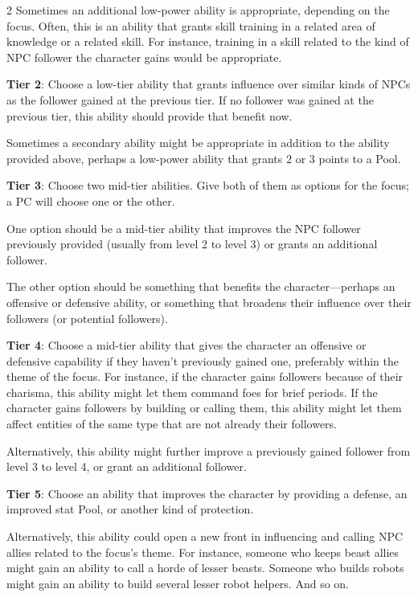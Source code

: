\begin{multicols}{2}
Sometimes an additional low-power ability is appropriate, depending on the focus. Often, this is an ability that grants skill training in a related area of knowledge or a related skill. For instance, training in a skill related to the kind of NPC follower the character gains would be appropriate.

\textbf{Tier 2}: Choose a low-tier ability that grants influence over similar kinds of NPCs as the follower gained at the previous tier. If no follower was gained at the previous tier, this ability should provide that benefit now. 

Sometimes a secondary ability might be appropriate in addition to the ability provided above, perhaps a low-power ability that grants 2 or 3 points to a Pool.

\textbf{Tier 3}: Choose two mid-tier abilities. Give both of them as options for the focus; a PC will choose one or the other.

One option should be a mid-tier ability that improves the NPC follower previously provided (usually from level 2 to level 3) or grants an additional follower.

The other option should be something that benefits the character—perhaps an offensive or defensive ability, or something that broadens their influence over their followers (or potential followers).

\textbf{Tier 4}: Choose a mid-tier ability that gives the character an offensive or defensive capability if they haven’t previously gained one, preferably within the theme of the focus. For instance, if the character gains followers because of their charisma, this ability might let them command foes for brief periods. If the character gains followers by building or calling them, this ability might let them affect entities of the same type that are not already their followers.

Alternatively, this ability might further improve a previously gained follower from level 3 to level 4, or grant an additional follower.

\textbf{Tier 5}: Choose an ability that improves the character by providing a defense, an improved stat Pool, or another kind of protection.

Alternatively, this ability could open a new front in influencing and calling NPC allies related to the focus’s theme. For instance, someone who keeps beast allies might gain an ability to call a horde of lesser beasts. Someone who builds robots might gain an ability to build several lesser robot helpers. And so on.


\end{multicols}
